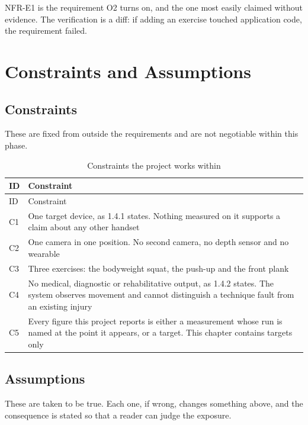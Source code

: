 NFR-E1 is the requirement O2 turns on, and the one most easily claimed without evidence. The verification is a diff: if adding an exercise touched application code, the requirement failed.

\section{Constraints and Assumptions}
\label{sec:3.5}

\subsection{Constraints}
\label{sec:3.5.1}

These are fixed from outside the requirements and are not negotiable within this phase.

{\small
\setlength{\LTpre}{6pt}\setlength{\LTpost}{8pt}
\begin{longtable}{>{\raggedright\arraybackslash}p{}>{\raggedright\arraybackslash}p{}}
\caption{Constraints the project works within}\\
\toprule
ID & Constraint \\
\midrule
\endfirsthead
\toprule
ID & Constraint \\
\midrule
\endhead
\bottomrule
\endfoot
\bottomrule
\endlastfoot
C1 & One target device, as 1.4.1 states. Nothing measured on it supports a claim about any other handset \\
C2 & One camera in one position. No second camera, no depth sensor and no wearable \\
C3 & Three exercises: the bodyweight squat, the push-up and the front plank \\
C4 & No medical, diagnostic or rehabilitative output, as 1.4.2 states. The system observes movement and cannot distinguish a technique fault from an existing injury \\
C5 & Every figure this project reports is either a measurement whose run is named at the point it appears, or a target. This chapter contains targets only \\
\end{longtable}
}

\subsection{Assumptions}
\label{sec:3.5.2}

These are taken to be true. Each one, if wrong, changes something above, and the consequence is stated so that a reader can judge the exposure.

